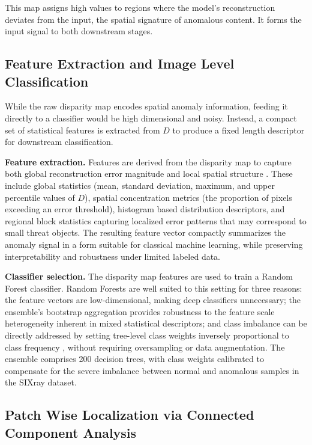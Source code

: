 \documentclass{bmvc2k}
\begin{document}
This map assigns high values to regions where the model's reconstruction deviates from the input, the spatial signature of anomalous content. It forms the input signal to both downstream stages.

\subsection{Feature Extraction and Image Level Classification}

While the raw disparity map encodes spatial anomaly information, feeding it directly to a classifier would be high dimensional and noisy. Instead, a compact set of statistical features is extracted from $D$ to produce a fixed length descriptor for downstream classification.

\textbf{Feature extraction.} Features are derived from the disparity map to capture both global reconstruction error magnitude and local spatial structure \cite{hassan2021unsupervised}. These include global statistics (mean, standard deviation, maximum, and upper percentile values of $D$), spatial concentration metrics (the proportion of pixels exceeding an error threshold), histogram based distribution descriptors, and regional block statistics capturing localized error patterns that may correspond to small threat objects. The resulting feature vector compactly summarizes the anomaly signal in a form suitable for classical machine learning, while preserving interpretability and robustness under limited labeled data.

\textbf{Classifier selection.} The disparity map features are used to train a Random Forest classifier. Random Forests are well suited to this setting for three reasons: the feature vectors are low-dimensional, making deep classifiers unnecessary; the ensemble's bootstrap aggregation provides robustness to the feature scale heterogeneity inherent in mixed statistical descriptors; and class imbalance can be directly addressed by setting tree-level class weights inversely proportional to class frequency \cite{baggage2022abdelfatah, sixray2019lingxi}, without requiring oversampling or data augmentation. The ensemble comprises 200 decision trees, with class weights calibrated to compensate for the severe imbalance between normal and anomalous samples in the SIXray dataset.

\subsection{Patch Wise Localization via Connected Component Analysis}
\end{document}
